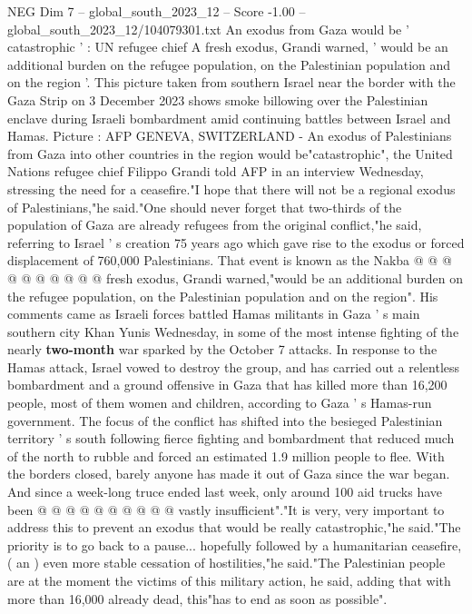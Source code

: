 \begin{textsample}{NEG Dim 7 – global\_south\_2023\_12 – Score -1.00 – global\_south\_2023\_12/104079301.txt}  \label{ex:f7_neg_195}
An exodus from Gaza would be ' catastrophic ' : UN refugee chief A fresh exodus, Grandi warned, ' would be an additional burden on the refugee population, on the Palestinian population and on the region '.
This picture taken from southern Israel near the border with the Gaza Strip on 3 December 2023 shows smoke billowing over the Palestinian enclave during Israeli bombardment amid continuing battles between Israel and Hamas.
Picture : AFP GENEVA, SWITZERLAND - An exodus of Palestinians from Gaza into other countries in the region would be"catastrophic", the United Nations refugee chief Filippo Grandi told AFP in an interview Wednesday, stressing the need for a ceasefire."I hope that there will not be a regional exodus of Palestinians,"he said."One should never forget that two-thirds of the population of Gaza are already refugees from the original conflict,"he said, referring to Israel ' s creation 75 years ago which gave rise to the exodus or forced displacement of 760,000 Palestinians.
That event is known as the Nakba @ @ @ @ @ @ @ @ @ @ fresh exodus, Grandi warned,"would be an additional burden on the refugee population, on the Palestinian population and on the region".
His comments came as Israeli forces battled Hamas militants in Gaza ' s main southern city Khan Yunis Wednesday, in some of the most intense fighting of the nearly \textbf{two-month} war sparked by the October 7 attacks.
In response to the Hamas attack, Israel vowed to destroy the group, and has carried out a relentless bombardment and a ground offensive in Gaza that has killed more than 16,200 people, most of them women and children, according to Gaza ' s Hamas-run government.
The focus of the conflict has shifted into the besieged Palestinian territory ' s south following fierce fighting and bombardment that reduced much of the north to rubble and forced an estimated 1.9 million people to flee.
With the borders closed, barely anyone has made it out of Gaza since the war began.
And since a week-long truce ended last week, only around 100 aid trucks have been @ @ @ @ @ @ @ @ @ @ vastly insufficient"."It is very, very important to address this to prevent an exodus that would be really catastrophic,"he said."The priority is to go back to a pause... hopefully followed by a humanitarian ceasefire, ( an ) even more stable cessation of hostilities,"he said."The Palestinian people are at the moment the victims of this military action, he said, adding that with more than 16,000 already dead, this"has to end as soon as possible".

\end{textsample}

